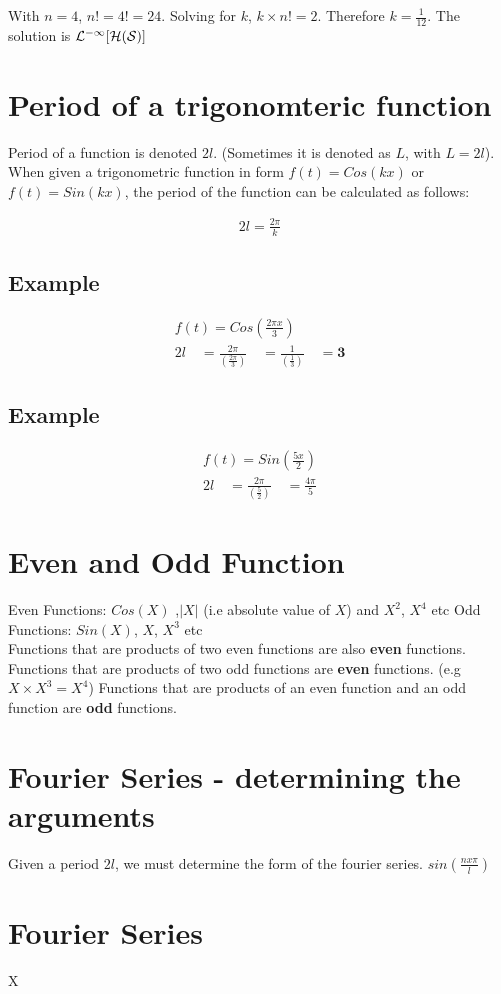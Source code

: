 \documentclass[12pt, a4paper]{article}
\begin{document}
With $n=4$, $n!= 4! = 24$. Solving for $k$, $k \times n! = 2$.
Therefore $k=\frac{1}{12}$. The solution is $\cal{L}^{-1}[H(S)]$

\section{Period of a trigonomteric function}
Period of a function is denoted $2l$. (Sometimes it is denoted as
$L$, with $L=2l$). \newline When given a trigonometric function in
form $f(t) = Cos(kx)$ or $f(t)= Sin(kx)$, the period of the
function can be calculated as follows:

\begin{eqnarray}
2l = \frac{2 \pi}{k}\nonumber
\end{eqnarray}


\subsection{Example}
\begin{eqnarray}f(t) = Cos(\frac{2 \pi x}{3}) \nonumber\\
2l \quad=\frac{2\pi}{(\frac{2\pi}{3})}\quad =
\frac{1}{(\frac{1}{3})}\quad= \textbf{3}\nonumber
\end{eqnarray}

\subsection{Example}
\begin{eqnarray}f(t) = Sin(\frac{5x}{2}) \nonumber\\
2l \quad=\frac{2\pi}{(\frac{5}{2})}\quad = \frac{4\pi}{5}\nonumber
\end{eqnarray}

\section{Even and Odd Function}
Even Functions: $Cos(X)$ ,$|X|$ (i.e absolute value of $X$) and
$X^2$, $X^4$ etc
\newline
Odd Functions: $Sin(X)$, $X$, $X^3$ etc
\\
Functions that are products of two even functions are also
\textbf{even} functions.
\newline
Functions that are products of two odd functions are
\textbf{even} functions. (e.g $X \times X^3 = X^4$)
\newline
Functions that are products of an even function and an
odd function are \textbf{odd} functions.
\section{Fourier Series - determining the arguments}
Given a period $2l$, we must determine the form of the fourier
series. $sin( \frac{n x \pi}{l})$
\section{Fourier Series}
X
\end{document}
